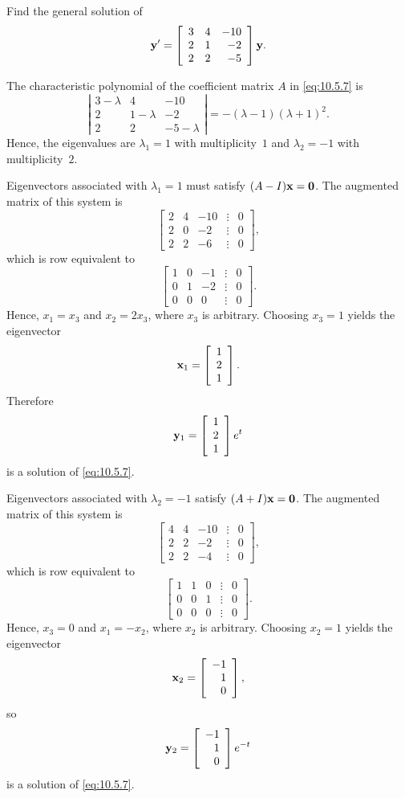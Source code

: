 \begin{example}
  \label{example:10.5.3}\rm Find the general solution of
  \begin{equation}
    \label{eq:10.5.7}{\bf y}'=\left[\begin{array}{rrr} 3&4&-10\\2&1&-2\\2&2&-5\end{array}\right]{\bf y}.
  \end{equation}
\end{example}

\begin{examplesolution}
\solution The characteristic polynomial of the coefficient matrix $A$ in \eqref{eq:10.5.7} is
\[
  \left|
  \begin{array}{ccc}
    3-\lambda & 4         & -10        \\
    2         & 1-\lambda & -2         \\
    2         & 2         & -5-\lambda
  \end{array}\right|=- (\lambda-1)(\lambda+1)^{2}.
\]
Hence, the eigenvalues are $\lambda_{1}=1$ with multiplicity~$1$ and $\lambda_{2}=-1$ with
multiplicity~$2$.

Eigenvectors associated with $\lambda_{1}=1$ must satisfy $(A-I){\bf x}={\bf0}$. The augmented
matrix of this system is
\[
  \left[
  \begin{array}{rrrcr}
    2 & 4 & -10 & \vdots & 0 \\
    2 & 0 & -2  & \vdots & 0 \\
    2 & 2 & -6  & \vdots & 0
  \end{array}\right],
\]
which is row equivalent to
\[
  \left[
  \begin{array}{rrrcr}
    1 & 0 & -1 & \vdots & 0 \\
    0 & 1 & -2 & \vdots & 0 \\
    0 & 0 & 0  & \vdots & 0
  \end{array}\right].
\]
Hence, $x_{1}=x_{3}$ and $x_{2}=2x_{3}$, where $x_{3}$ is arbitrary. Choosing $x_{3}=1$ yields the
eigenvector
\[
  {\bf x}_{1}=\left[\begin{array}{r}1\\2\\1\end{array}\right].
\]
Therefore
\[
  {\bf y}_{1}=\left[\begin{array}{r}1\\2\\1\end{array}\right]e^{t}
\]
is a solution of \eqref{eq:10.5.7}.

Eigenvectors associated with $\lambda_{2}=-1$ satisfy $(A+I){\bf x}={\bf0}$. The augmented matrix of
this system is
\[
  \left[
  \begin{array}{rrrcr}
    4 & 4 & -10 & \vdots & 0 \\
    2 & 2 & -2  & \vdots & 0 \\
    2 & 2 & -4  & \vdots & 0
  \end{array}\right],
\]
which is row equivalent to
\[
  \left[
  \begin{array}{rrrcr}
    1 & 1 & 0 & \vdots & 0 \\
    0 & 0 & 1 & \vdots & 0 \\
    0 & 0 & 0 & \vdots & 0
  \end{array}\right].
\]
Hence, $x_{3}=0$ and $x_{1}=-x_{2}$, where $x_{2}$ is arbitrary. Choosing $x_{2}=1$ yields the
eigenvector
\[
  {\bf x}_{2}=\left[\begin{array}{r}-1\\1\\0\end{array}\right],
\]
so
\[
  {\bf y}_{2}=\left[\begin{array}{r}-1\\1\\0\end{array}\right]e^{-t}
\]
is a solution of \eqref{eq:10.5.7}.


\end{examplesolution}
